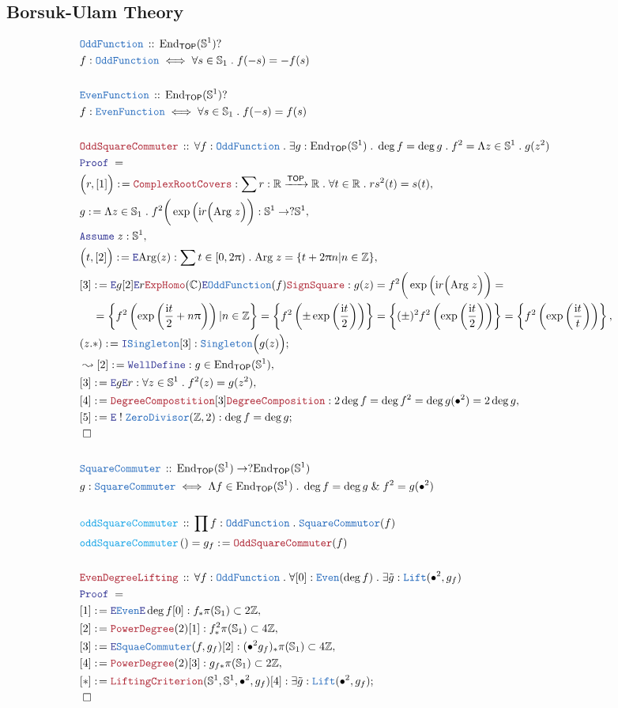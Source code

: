 \documentclass[12pt]{scrartcl}
\newcommand{\TYPE}[1]{\textcolor{NavyBlue}{\mathtt{#1}}}
\newcommand{\FUNC}[1]{\textcolor{Cerulean}{\mathtt{#1}}}
\newcommand{\LOGIC}[1]{\textcolor{Blue}{\mathtt{#1}}}
\newcommand{\THM}[1]{\textcolor{Maroon}{\mathtt{#1}}}
\renewcommand{\.}{\; . \;}
\newcommand{\de}{: \kern 0.1pc =}
\newcommand{\IsNot}{\; ! \;}
\newcommand{\Act}[1]{\left( #1 \right)}
\newcommand{\Theorem}[2]{& \THM{#1} \, :: \, #2 \\ & \Proof = \\ }
\newcommand{\DeclareType}[2]{& \TYPE{#1} \, :: \, #2 \\}
\newcommand{\DefineType}[3]{& #1 : \TYPE{#2} \iff #3 \\}
\newcommand{\DeclareFunc}[2]{& \FUNC{#1} \, :: \, #2 \\}
\newcommand{\DefineNamedFunc}[4]{&  \FUNC{#1}\Act{#2} = #3 \de #4 \\}
\newcommand{\NewLine}{\\ & \kern 1pc}
\newcommand{\Page}[1]{ \begin{align*} #1 \end{align*}   }
\renewcommand{\And}{\; \& \;}
\newcommand{\Intro}{\LOGIC{I}}
\newcommand{\Elim}{\LOGIC{E}}
\newcommand{\Int}{\mathbb{Z} }
\newcommand{\Reals}{\mathbb{R} }
\newcommand{\Complex}{\mathbb{C}}
\newcommand{\Sphere}{\mathbb{S}}
\newcommand{\End}{\mathrm{End}}
\newcommand{\Arrow}{\xrightarrow}
\newcommand{\Say}[3]{& #1 \de #2 : #3, \\}
\newcommand{\Conclude}[3]{& #1 \de #2 : #3; \\}
\newcommand{\Derive}[3]{& \leadsto #1 \de #2 : #3, \\}
\newcommand{\Assume}[2]{& \LOGIC{Assume} \; #1 : #2, \\}
\newcommand{\QED}{\; \square}
\newcommand{\EndProof}{& \QED \\}
\newcommand{\Proof}{\LOGIC{Proof} \; }
\newcommand{\TOP}{\mathsf{TOP}}
\begin{document}
\subsection{Borsuk-Ulam Theory}
\Page{
	\DeclareType{OddFunction}{\End_{\TOP}(\Sphere^1)?}
	\DefineType{f}{OddFunction}{\forall s \in \Sphere_1 \. f(-s) = -f(s)}
	\\
	\DeclareType{EvenFunction}{\End_{\TOP}(\Sphere^1)?}
	\DefineType{f}{EvenFunction}{\forall s \in \Sphere_1 \. f(-s) = f(s)}
	\\
	\Theorem{OddSquareCommuter}{
		\forall f : \TYPE{OddFunction} \.
		\exists g : \End_{\TOP}(\Sphere^1) \.
		\deg f = \deg g \.
		f^2 = \Lambda z \in \Sphere^1 \. g(z^2)
	}
	\Say{ \Big( r, [1]\Big)  }{ \THM{ComplexRootCovers} }
	{
		\sum r : \Reals \Arrow{\TOP} \Reals \. 
		\forall t \in \Reals \. 
		rs^2(t)   = s(t)
	}
	\Say{g}{\Lambda z \in \Sphere_1 \. f^2\bigg(\exp\Big(\mathrm{i}r\Big( \mathrm{Arg}\; z\Big) \bigg) }
	{
		\Sphere^1 \to ?\Sphere^1
	}
	\Assume{z}{\Sphere^1}
	\Say{\Big( t,[2] \Big)}{\Elim \mathrm{Arg}(z)}
	{ \sum t \in [0, 2\uppi) \. \mathrm{Arg}\;z = \{ t + 2\uppi n | n \in \Int \} }
	\Say{[3]}
	{
		\Elim g 
		[2] \Elim r 
		\THM{ExpHomo}(\Complex)
		\Elim \TYPE{OddFunction}(f)
		\THM{SignSquare}
	}
	{
		g(z) = 	
		f^2\bigg(\exp\Big(\mathrm{i}r\Big( \mathrm{Arg}\; z\Big) \bigg) = \NewLine = 
		\left\{ f^2\left(\exp\left( \frac{\mathrm{i}t}{2} + n \uppi \right)\right)  |n \in \Int\right\} =
		\left\{ f^2\left(\pm\exp\left( \frac{\mathrm{i}t}{2}  \right)\right)  \right\}  =
		\left\{ (\pm)^2 f^2\left(\exp\left( \frac{\mathrm{i}t}{2}  \right)\right)  \right\}  =
		\left\{  f^2 \left(\exp\left( \frac{\mathrm{i}t}{t} \right) \right) \right\}
	}
	\Conclude{(z.*)}{\Intro \TYPE{Singleton}[3]}{\TYPE{Singleton}\Big(g(z)\Big)}
	\Derive{[2]}{\LOGIC{WellDefine}}{g \in \End_{\TOP}(\Sphere^1)}
	\Say{[3]}{\Elim g \Elim r}{ \forall z \in \Sphere^1 \.  f^2(z) =  g(z^2)  } 
	\Say{[4]}{\THM{DegreeCompostition}[3]\THM{DegreeComposition}}
	{
		2 \deg f = \deg f^2 = \deg g(\bullet^2) = 2 \deg g
	}
	\Conclude{[5]}{\Elim \IsNot \TYPE{ZeroDivisor}(\Int,2)}{\deg f = \deg g}
	\EndProof
	\\
	\DeclareType{SquareCommuter}
	{
		\End_{\TOP}(\Sphere^1) \to  ?\End_{\TOP}(\Sphere^1)
	}
	\DefineType{g}{SquareCommuter}
	{
		\Lambda f \in \End_{\TOP}(\Sphere^1) \.
		\deg f = \deg g \And f^2 = g(\bullet^2)
	}
	\\
	\DeclareFunc{oddSquareCommuter}
	{
		\prod f : \TYPE{OddFunction} \. \TYPE{SquareCommutor}(f)
	}
	\DefineNamedFunc{oddSquareCommuter}{}{g_f}
	{
		\THM{OddSquareCommuter}(f)
	}
	\\
	\Theorem{EvenDegreeLifting}
	{
		\forall f : \TYPE{OddFunction} \.
		\forall [0] : \TYPE{Even}(\deg f) \.
		\exists \tilde g : \TYPE{Lift}(\bullet^2,g_f)
	}
	\Say{ [1] }{\Elim \TYPE{Even} \Elim \deg f [0]}
	{
		f_* \pi(\Sphere_1) \subset 2 \Int
	}
	\Say{[2]}{\THM{PowerDegree}(2)[1]}
	{
		f^2_* \pi(\Sphere_1) \subset 4 \Int
	}
	\Say{[3]}{\Elim \TYPE{SquaeCommuter}(f,g_f)[2]}
	{
		(\bullet^2g_{f})_* \pi(\Sphere_1) \subset 4 \Int
	}
	\Say{[4]}{\THM{PowerDegree}(2)[3]}
	{ 
		g_{f*} \pi(\Sphere_1) \subset 2 \Int
	}
	\Conclude{[*]}{\THM{LiftingCriterion}(\Sphere^1,\Sphere^1,\bullet^2,g_f)[4]}
	{
		\exists \tilde g : \TYPE{Lift}(\bullet^2,g_f)
	}
	\EndProof
}
\end{document}
